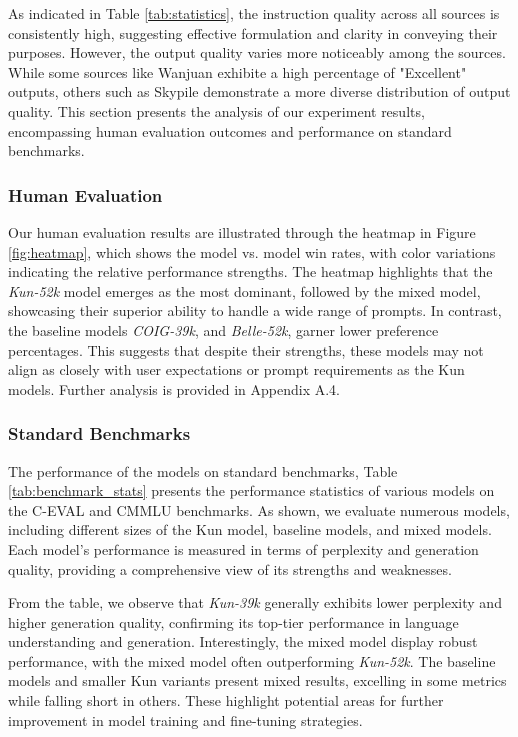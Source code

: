 As indicated in Table \ref{tab:statistics}, the instruction quality across all sources is consistently high, suggesting effective formulation and clarity in conveying their purposes. However, the output quality varies more noticeably among the sources. While some sources like Wanjuan exhibite a high percentage of "Excellent" outputs, others such as Skypile demonstrate a more diverse distribution of output quality. This section presents the analysis of our experiment results, encompassing human evaluation outcomes and performance on standard benchmarks. 

\subsubsection{Human Evaluation}
\label{sec:import area}

Our human evaluation results are illustrated through the heatmap in Figure \ref{fig:heatmap}, which shows the model vs. model win rates, with color variations indicating the relative performance strengths. 
The heatmap highlights that the \emph{Kun-52k} model emerges as the most dominant, followed by the mixed model, showcasing their superior ability to handle a wide range of prompts. 
In contrast, the baseline models \emph{COIG-39k}, and \emph{Belle-52k}, garner lower preference percentages. This suggests that despite their strengths, these models may not align as closely with user expectations or prompt requirements as the Kun models.
Further analysis is provided in Appendix A.4.

\subsubsection{Standard Benchmarks}
The performance of the models on standard benchmarks, Table \ref{tab:benchmark_stats} presents the performance statistics of various models on the C-EVAL and CMMLU benchmarks. As shown, we evaluate numerous models, including different sizes of the Kun model, baseline models, and mixed models. Each model's performance is measured in terms of perplexity and generation quality, providing a comprehensive view of its strengths and weaknesses.

From the table, we observe that \emph{Kun-39k} generally exhibits lower perplexity and higher generation quality, confirming its top-tier performance in language understanding and generation. Interestingly, the mixed model display robust performance, with the mixed model often outperforming \emph{Kun-52k}. The baseline models and smaller Kun variants present mixed results, excelling in some metrics while falling short in others. 
These highlight potential areas for further improvement in model training and fine-tuning strategies.

